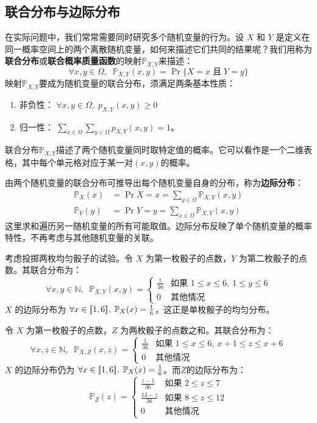 \documentclass[12pt,UTF8,fontset=none]{ctexbook}
\begin{document}
\subsection{联合分布与边际分布}

在实际问题中，我们常常需要同时研究多个随机变量的行为。设 \(X\) 和 \(Y\) 是定义在同一概率空间上的两个离散随机变量，如何来描述它们共同的结果呢？我们用称为\textbf{联合分布}或\textbf{联合概率质量函数}的映射$\mathbb{P}_{X,Y}$来描述：
\[
\forall x, y \in \Omega,\;\; \mathbb{P}_{X,Y}(x,y) = \Pr{\{X = x\; \mbox{且}\; Y = y\}}
\]
映射$\mathbb{P}_{X,Y}$要成为随机变量的联合分布，须满足两条基本性质：
\begin{enumerate}
    \item 非负性： \( \forall x, y \in \Omega,\; p_{X,Y}(x,y) \geq 0\) 
    \item 归一性： \( \displaystyle\sum_{x\in \Omega} \sum_{y\in \Omega} p_{X,Y}(x,y) = 1\)。
\end{enumerate}
联合分布$\mathbb{P}_{X,Y}$描述了两个随机变量同时取特定值的概率。它可以看作是一个二维表格，其中每个单元格对应于某一对$(x,y)$的概率。

由两个随机变量的联合分布可推导出每个随机变量自身的分布，称为\textbf{边际分布}：
\begin{align*}
\mathbb{P}_X(x) &= \Pr{X = x} = \sum_{y\in \Omega} \mathbb{P}_{X,Y}(x,y) \\
\mathbb{P}_Y(y) &= \Pr{Y = y} = \sum_{x\in \Omega} \mathbb{P}_{X,Y}(x,y)
\end{align*}
这里求和遍历另一随机变量的所有可能取值。边际分布反映了单个随机变量的概率特性，不再考虑与其他随机变量的关联。

\begin{ex}
考虑投掷两枚均匀骰子的试验。令 \(X\) 为第一枚骰子的点数，\(Y\) 为第二枚骰子的点数。其联合分布为：
\[
\forall x,y \in \mathbb{N},\;\;
\mathbb{P}_{X,Y}(x,y) = \begin{cases} 
\frac{1}{36} & \text{如果 } 1 \leq x \leq 6,\ 1 \leq y \leq 6 \\
0 & \text{其他情况}
\end{cases}
\]
\(X\) 的边际分布为 \(\forall x\in[\![1,6]\!],\; \mathbb{P}_X(x) = \frac{1}{6}\)，这正是单枚骰子的均匀分布。

令 \(X\) 为第一枚骰子的点数，\(Z\) 为两枚骰子的点数之和。其联合分布为：
\[
\forall x,z \in \mathbb{N},\;\;
\mathbb{P}_{X,Z}(x,z) = \begin{cases} 
\frac{1}{36} & \text{如果 } 1 \leq x \leq 6,\ x+1 \leq z \leq x+6 \\
0 & \text{其他情况}
\end{cases}
\]
\(X\) 的边际分布仍为 \(\forall x\in[\![1,6]\!],\; \mathbb{P}_X(x) = \frac{1}{6}\)。而$Z$的边际分布为：
\[
\mathbb{P}_Z(z) = \begin{cases} 
\frac{z-1}{36} & \text{如果 } 2 \leq z \leq 7 \\
\frac{13-z}{36} & \text{如果 } 8 \leq z \leq 12 \\
0 & \text{其他情况}
\end{cases}
\]

\end{ex}
\end{document}
